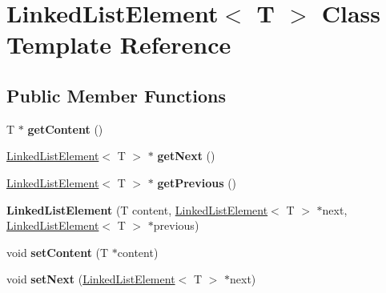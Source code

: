 \hypertarget{class_linked_list_element}{}\section{Linked\+List\+Element$<$ T $>$ Class Template Reference}
\label{class_linked_list_element}
\subsection*{Public Member Functions}
\begin{DoxyCompactItemize}
\item 
\mbox{\label{class_linked_list_element_aec3efdfe4e7a3b5798fcc5001be04852}} 
T $\ast$ {\bfseries get\+Content} ()
\item 
\mbox{\label{class_linked_list_element_a47f626833cf17b673c3391324c105aba}} 
\mbox{\hyperlink{class_linked_list_element}{Linked\+List\+Element}}$<$ T $>$ $\ast$ {\bfseries get\+Next} ()
\item 
\mbox{\label{class_linked_list_element_a228977625e94b5ff384cbeaab3c1679e}} 
\mbox{\hyperlink{class_linked_list_element}{Linked\+List\+Element}}$<$ T $>$ $\ast$ {\bfseries get\+Previous} ()
\item 
\mbox{\label{class_linked_list_element_acb8b00e8856bf7b034e22d819a7f0967}} 
{\bfseries Linked\+List\+Element} (T content, \mbox{\hyperlink{class_linked_list_element}{Linked\+List\+Element}}$<$ T $>$ $\ast$next, \mbox{\hyperlink{class_linked_list_element}{Linked\+List\+Element}}$<$ T $>$ $\ast$previous)
\item 
\mbox{\label{class_linked_list_element_a12e8ffd568a87ef6198bdd72c8ce54a1}} 
void {\bfseries set\+Content} (T $\ast$content)
\item 
\mbox{\label{class_linked_list_element_a43244c7b6686e5719fc1618046d10eb7}} 
void {\bfseries set\+Next} (\mbox{\hyperlink{class_linked_list_element}{Linked\+List\+Element}}$<$ T $>$ $\ast$next)
\item 
\mbox{\label{class_linked_list_element_aaecf5c1df741b1de45448c46ace719b7}} 

\end{DoxyCompactItemize}
